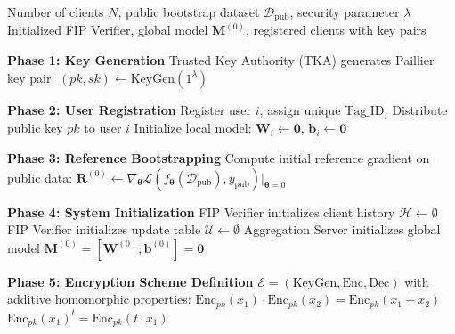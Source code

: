 \documentclass[10pt,journal,compsoc]{IEEEtran}
\begin{document}
\begin{algorithm}[H]
\caption{FIP-FL System Setup and Key Distribution}
\label{alg:setup}
\begin{algorithmic}[1]
\Require Number of clients $N$, public bootstrap dataset $\mathcal{D}_{\text{pub}}$, security parameter $\lambda$
\Ensure Initialized FIP Verifier, global model $\mathbf{M}^{(0)}$, registered clients with key pairs

\Statex \textbf{Phase 1: Key Generation}
\State Trusted Key Authority (TKA) generates Paillier key pair:
\State \hspace{\algorithmicindent} $(pk, sk) \gets \text{KeyGen}(1^\lambda)$

\Statex \textbf{Phase 2: User Registration}
    \State Register user $i$, assign unique $\text{Tag\_ID}_i$
    \State Distribute public key $pk$ to user $i$
    \State Initialize local model: $\mathbf{W}_i \gets \mathbf{0}$, $\mathbf{b}_i \gets \mathbf{0}$
\EndFor

\Statex \textbf{Phase 3: Reference Bootstrapping}
\State Compute initial reference gradient on public data:
\State $\mathbf{R}^{(0)} \gets \nabla_{\bm{\theta}} \mathcal{L}(f_{\bm{\theta}}(\mathcal{D}_{\text{pub}}), y_{\text{pub}}) \big|_{\bm{\theta}=0}$

\Statex \textbf{Phase 4: System Initialization}
\State FIP Verifier initializes client history $\mathcal{H} \gets \emptyset$
\State FIP Verifier initializes update table $\mathcal{U} \gets \emptyset$
\State Aggregation Server initializes global model $\mathbf{M}^{(0)} = [\mathbf{W}^{(0)}; \mathbf{b}^{(0)}] = \mathbf{0}$

\Statex \textbf{Phase 5: Encryption Scheme Definition}
\Statex $\mathcal{E} = (\text{KeyGen}, \text{Enc}, \text{Dec})$ with additive homomorphic properties:
\Statex \hspace{\algorithmicindent} $\text{Enc}_{pk}(x_1) \cdot \text{Enc}_{pk}(x_2) = \text{Enc}_{pk}(x_1 + x_2)$
\Statex \hspace{\algorithmicindent} $\text{Enc}_{pk}(x_1)^t = \text{Enc}_{pk}(t \cdot x_1)$
\end{algorithmic}
\end{algorithm}
\end{document}
